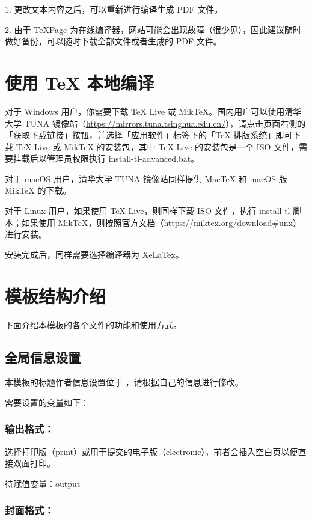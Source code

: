 1. 更改文本内容之后，可以重新进行编译生成 PDF 文件。

2. 由于 TeXPage 为在线编译器，网站可能会出现故障（很少见），因此建议随时做好备份，可以随时下载全部文件或者生成的 PDF 文件。

\section{使用 TeX 本地编译}

对于 Windows 用户，你需要下载 TeX Live 或 MikTeX。国内用户可以使用清华大学 TUNA 镜像站（\url{https://mirrors.tuna.tsinghua.edu.cn/}），请点击页面右侧的「获取下载链接」按钮，并选择「应用软件」标签下的「TeX 排版系统」即可下载 TeX Live 或 MikTeX 的安装包，其中 TeX Live 的安装包是一个 ISO 文件，需要挂载后以管理员权限执行 install-tl-advanced.bat。

对于 macOS 用户，清华大学 TUNA 镜像站同样提供 MacTeX 和 macOS 版 MikTeX 的下载。

对于 Linux 用户，如果使用 TeX Live，则同样下载 ISO 文件，执行 install-tl 脚本；如果使用 MikTeX，则按照官方文档（\url{https://miktex.org/download\#unx}）进行安装。

安装完成后，同样需要选择编译器为 XeLaTex。

\section{模板结构介绍}

下面介绍本模板的各个文件的功能和使用方式。

\subsection{全局信息设置}

本模板的标题作者信息设置位于 ，请根据自己的信息进行修改。

需要设置的变量如下：

\subsubsection{输出格式：}

选择打印版（print）或用于提交的电子版（electronic），前者会插入空白页以便直接双面打印。

待赋值变量：output

\subsubsection{封面格式：}

